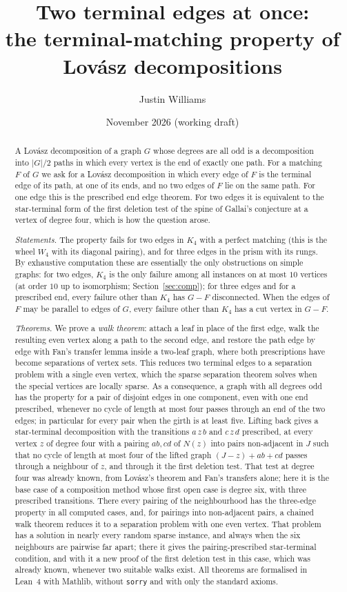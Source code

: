 \documentclass[11pt]{amsart}
\title[Two terminal edges at once]{Two terminal edges at once:\\
the terminal-matching property of Lov\'asz decompositions}
\author{Justin Williams}
\date{November 2026 (working draft)}
\theoremstyle{definition}
\begin{document}
\begin{abstract}
A Lov\'asz decomposition of a graph $G$ whose degrees are all odd is a decomposition into $|G|/2$
paths in which every vertex is the end of exactly one path. For a matching $F$ of $G$ we ask for
a Lov\'asz decomposition in which every edge of $F$ is the terminal edge of its path, at one of
its ends, and no two edges of $F$ lie on the same path. For one edge this is the prescribed end
edge theorem. For two edges it is equivalent to the star-terminal form of the first deletion test
of the spine of Gallai's conjecture at a vertex of degree four, which is how the question arose.

\emph{Statements.} The property fails for two edges in $K_4$ with a perfect matching (this is the
wheel $W_4$ with its diagonal pairing), and for three edges in the prism with its rungs. By
exhaustive computation these are essentially the only obstructions on simple graphs: for two
edges, $K_4$ is the only failure among all instances on at most $10$ vertices (at order $10$ up to
isomorphism; Section~\ref{sec:comp}); for three edges and for a prescribed end, every failure other than $K_4$
has $G-F$ disconnected. When the edges of $F$ may be parallel to edges of $G$, every failure
other than $K_4$ has a cut vertex in $G-F$.

\emph{Theorems.} We prove a \emph{walk theorem}: attach a leaf in place of the first edge, walk
the resulting even vertex along a path to the second edge, and restore the path edge by edge with
Fan's transfer lemma inside a two-leaf graph, where both prescriptions have become separations of
vertex sets. This reduces two terminal edges to a separation problem with a single even vertex,
which the sparse separation theorem solves when the special vertices are locally sparse. As a
consequence, a graph with all degrees odd has the property for a pair of disjoint edges in one
component, even with one end prescribed, whenever no cycle of length at most four passes through
an end of the two edges; in particular for every pair when the girth is at least five. Lifting
back gives a star-terminal decomposition with the transitions $a\,z\,b$ and $c\,z\,d$ prescribed,
at every vertex $z$ of degree four with a pairing $ab,cd$ of $N(z)$ into pairs non-adjacent in $J$
such that no cycle of length at most four of the lifted graph $(J-z)+ab+cd$ passes through a
neighbour of $z$, and through it the first deletion test. That test at degree four was already
known, from Lov\'asz's theorem and Fan's transfers alone; here it is the base case of a
composition method whose first open case is degree six, with three prescribed transitions.
There every pairing of the neighbourhood has the three-edge property in all computed cases, and,
for pairings into non-adjacent pairs, a chained walk theorem reduces it to a separation problem
with one even vertex. That problem has a solution in nearly every random sparse instance, and
always when the six neighbours are pairwise far apart; there it gives the pairing-prescribed
star-terminal condition, and with it a new proof of the first deletion test in this case, which
was already known, whenever two suitable walks exist. All theorems are formalised in Lean~4 with Mathlib, without \texttt{sorry} and with only the
standard axioms.
\end{abstract}
\end{document}
